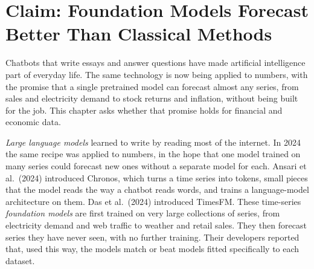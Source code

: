 \makeatletter
{}
\makeatother

\makeatletter
\makeatother

\chapter{Claim: Foundation Models Forecast Better Than Classical Methods}
\label{ch:20}
\providecommand{\term}[1]{\emph{#1}}

Chatbots that write essays and answer questions have made artificial intelligence part of everyday life. The same technology is now being applied to numbers, with the promise that a single pretrained model can forecast almost any series, from sales and electricity demand to stock returns and inflation, without being built for the job. This chapter asks whether that promise holds for financial and economic data.

\term{Large language models} learned to write by reading most of the internet. In 2024 the same recipe was applied to numbers, in the hope that one model trained on many series could forecast new ones without a separate model for each. Ansari et al.\ (2024) introduced Chronos, which turns a time series into tokens, small pieces that the model reads the way a chatbot reads words, and trains a language-model architecture on them. Das et al.\ (2024) introduced TimesFM. These time-series \term{foundation models} are first trained on very large collections of series, from electricity demand and web traffic to weather and retail sales. They then forecast series they have never seen, with no further training. Their developers reported that, used this way, the models match or beat models fitted specifically to each dataset.

